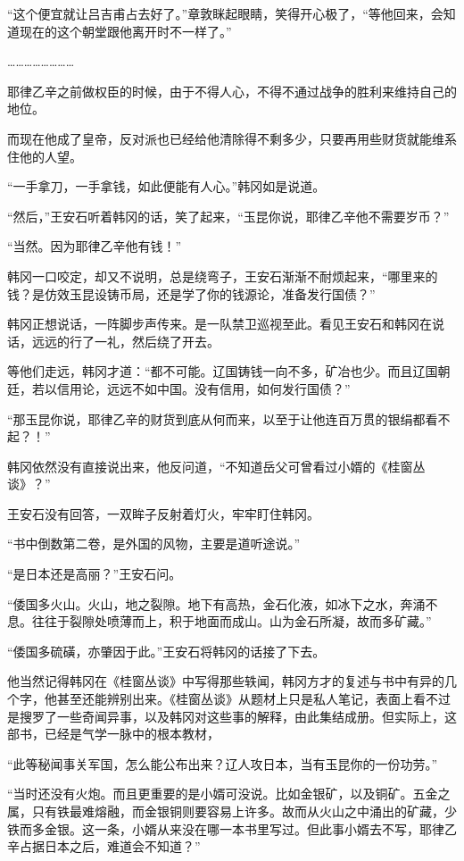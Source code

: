 “这个便宜就让吕吉甫占去好了。”章敦眯起眼睛，笑得开心极了，“等他回来，会知道现在的这个朝堂跟他离开时不一样了。”

……………………

耶律乙辛之前做权臣的时候，由于不得人心，不得不通过战争的胜利来维持自己的地位。

而现在他成了皇帝，反对派也已经给他清除得不剩多少，只要再用些财货就能维系住他的人望。

“一手拿刀，一手拿钱，如此便能有人心。”韩冈如是说道。

“然后，”王安石听着韩冈的话，笑了起来，“玉昆你说，耶律乙辛他不需要岁币？”

“当然。因为耶律乙辛他有钱！”

韩冈一口咬定，却又不说明，总是绕弯子，王安石渐渐不耐烦起来，“哪里来的钱？是仿效玉昆设铸币局，还是学了你的钱源论，准备发行国债？”

韩冈正想说话，一阵脚步声传来。是一队禁卫巡视至此。看见王安石和韩冈在说话，远远的行了一礼，然后绕了开去。

等他们走远，韩冈才道：“都不可能。辽国铸钱一向不多，矿冶也少。而且辽国朝廷，若以信用论，远远不如中国。没有信用，如何发行国债？”

“那玉昆你说，耶律乙辛的财货到底从何而来，以至于让他连百万贯的银绢都看不起？！”

韩冈依然没有直接说出来，他反问道，“不知道岳父可曾看过小婿的《桂窗丛谈》？”

王安石没有回答，一双眸子反射着灯火，牢牢盯住韩冈。

“书中倒数第二卷，是外国的风物，主要是道听途说。”

“是日本还是高丽？”王安石问。

“倭国多火山。火山，地之裂隙。地下有高热，金石化液，如冰下之水，奔涌不息。往往于裂隙处喷薄而上，积于地面而成山。山为金石所凝，故而多矿藏。”

“倭国多硫磺，亦肇因于此。”王安石将韩冈的话接了下去。

他当然记得韩冈在《桂窗丛谈》中写得那些轶闻，韩冈方才的复述与书中有异的几个字，他甚至还能辨别出来。《桂窗丛谈》从题材上只是私人笔记，表面上看不过是搜罗了一些奇闻异事，以及韩冈对这些事的解释，由此集结成册。但实际上，这部书，已经是气学一脉中的根本教材，

“此等秘闻事关军国，怎么能公布出来？辽人攻日本，当有玉昆你的一份功劳。”

“当时还没有火炮。而且更重要的是小婿可没说。比如金银矿，以及铜矿。五金之属，只有铁最难熔融，而金银铜则要容易上许多。故而从火山之中涌出的矿藏，少铁而多金银。这一条，小婿从来没在哪一本书里写过。但此事小婿去不写，耶律乙辛占据日本之后，难道会不知道？”

